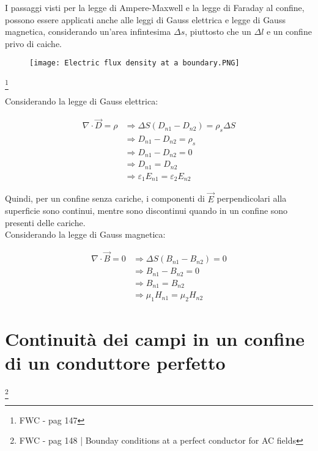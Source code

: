 I passaggi visti per la legge di Ampere-Maxwell e la legge di Faraday al confine, possono essere applicati anche 
alle leggi di Gauss elettrica e legge di Gauss magnetica, considerando un'area infintesima $\Delta s$, piuttosto che un $\Delta l$ e un confine privo di caiche. \\ 

\begin{figure}[h]
    \centering 
    \texttt{[image: Electric flux density at a boundary.PNG]}
\end{figure} 

\footnote{FWC - pag 147}


Considerando la legge di Gauss elettrica: 

{\Large \begin{equation} 
    \begin{split}
        \nabla \cdot \vec{D} = \rho  
        &\Rightarrow \Delta S (D_{n1} - D_{n2}) = \rho_s \Delta S 
        \\
        &\Rightarrow D_{n1} - D_{n2} = \rho_s\\ 
        &\Rightarrow D_{n1} - D_{n2} = 0 \\
        &\Rightarrow D_{n1} = D_{n2} \\
        &\Rightarrow \varepsilon_1 E_{n1} = \varepsilon_2 E_{n2}
    \end{split} 
\end{equation}}

Quindi, per un confine senza cariche, i componenti di $\vec{E}$ perpendicolari alla superficie sono continui, mentre sono discontinui quando in 
un confine sono presenti delle cariche. \\ 

Considerando la legge di Gauss magnetica: 

{\Large \begin{equation}
    \begin{split}
    \nabla \cdot \vec{B} = 0  
    &\Rightarrow \Delta S (B_{n1} - B_{n2}) = 0 \\
    &\Rightarrow B_{n1} - B_{n2} = 0 \\ 
    &\Rightarrow B_{n1} = B_{n2} \\ 
    &\Rightarrow \mu_1 H_{n1} = \mu_2 H_{n2}
    \end{split}
\end{equation}}

\newpage 

\section{Continuità dei campi in un confine di un conduttore perfetto }
\footnote{FWC - pag 148 | Bounday conditions at a perfect conductor for AC fields} 

